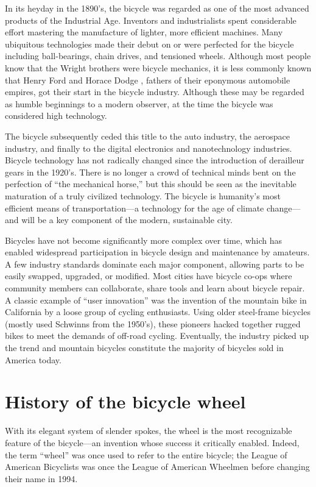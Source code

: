 \documentclass[../thesis.tex]{subfiles}
\begin{document}

In its heyday in the 1890's, the bicycle was regarded as one of the most advanced products of the Industrial Age. Inventors and industrialists spent considerable effort mastering the manufacture of lighter, more efficient machines. Many ubiquitous technologies made their debut on or were perfected for the bicycle including ball-bearings, chain drives, and tensioned wheels. Although most people know that the Wright brothers were bicycle mechanics, it is less commonly known that Henry Ford and Horace Dodge \cite{}, fathers of their eponymous automobile empires, got their start in the bicycle industry. Although these may be regarded as humble beginnings to a modern observer, at the time the bicycle was considered high technology.

The bicycle subsequently ceded this title to the auto industry, the aerospace industry, and finally to the digital electronics and nanotechnology industries. Bicycle technology has not radically changed since the introduction of derailleur gears in the 1920’s. There is no longer a crowd of technical minds bent on the perfection of ``the mechanical horse,'' but this should be seen as the inevitable maturation of a truly civilized technology. The bicycle is humanity's most efficient means of transportation---a technology for the age of climate change---and will be a key component of the modern, sustainable city.

Bicycles have not become significantly more complex over time, which has enabled widespread participation in bicycle design and maintenance by amateurs. A few industry standards dominate each major component, allowing parts to be easily swapped, upgraded, or modified. Most cities have bicycle co-ops where community members can collaborate, share tools and learn about bicycle repair. A classic example of “user innovation” was the invention of the mountain bike in California by a loose group of cycling enthusiasts. Using older steel-frame bicycles (mostly used Schwinns from the 1950’s), these pioneers hacked together rugged bikes to meet the demands of off-road cycling. Eventually, the industry picked up the trend and mountain bicycles constitute the majority of bicycles sold in America today\cite{NoHands}.


\section{History of the bicycle wheel}
With its elegant system of slender spokes, the wheel is the most recognizable feature of the bicycle---an invention whose success it critically enabled. Indeed, the term ``wheel'' was once used to refer to the entire bicycle; the League of American Bicyclists was once the League of American Wheelmen before changing their name in 1994.
\end{document}
